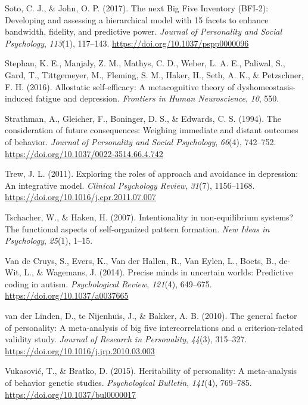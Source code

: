 \documentclass[
  jou,
  floatsintext,
  longtable,
  nolmodern,
  notxfonts,
  notimes,
  12pt,
  colorlinks=true,linkcolor=blue,citecolor=blue,urlcolor=blue]{apa7}
\newlength{\cslhangindent}
\newenvironment{CSLReferences}[2] %
 {\begin{list}{}{%
  \setlength{\itemindent}{0pt}
  \setlength{\leftmargin}{0pt}
  \setlength{\parsep}{0pt}
  \ifodd #1
   \setlength{\leftmargin}{\cslhangindent}
   \setlength{\itemindent}{-1\cslhangindent}
  \fi
  \setlength{\itemsep}{#2\baselineskip}}}
 {\end{list}}
\begin{document}
\begin{CSLReferences}{1}{0}
Soto, C. J., \& John, O. P. (2017). The next {Big} {Five} {Inventory}
({BFI-2}): Developing and assessing a hierarchical model with 15 facets
to enhance bandwidth, fidelity, and predictive power. \emph{Journal of
Personality and Social Psychology}, \emph{113}(1), 117--143.
\url{https://doi.org/10.1037/pspp0000096}

Stephan, K. E., Manjaly, Z. M., Mathys, C. D., Weber, L. A. E., Paliwal,
S., Gard, T., Tittgemeyer, M., Fleming, S. M., Haker, H., Seth, A. K.,
\& Petzschner, F. H. (2016). Allostatic self-efficacy: A metacognitive
theory of dyshomeostasis-induced fatigue and depression. \emph{Frontiers
in Human Neuroscience}, \emph{10}, 550.

Strathman, A., Gleicher, F., Boninger, D. S., \& Edwards, C. S. (1994).
The consideration of future consequences: Weighing immediate and distant
outcomes of behavior. \emph{Journal of Personality and Social
Psychology}, \emph{66}(4), 742--752.
\url{https://doi.org/10.1037/0022-3514.66.4.742}

Trew, J. L. (2011). Exploring the roles of approach and avoidance in
depression: An integrative model. \emph{Clinical Psychology Review},
\emph{31}(7), 1156--1168.
\url{https://doi.org/10.1016/j.cpr.2011.07.007}

Tschacher, W., \& Haken, H. (2007). Intentionality in non-equilibrium
systems? The functional aspects of self-organized pattern formation.
\emph{New Ideas in Psychology}, \emph{25}(1), 1--15.

Van de Cruys, S., Evers, K., Van der Hallen, R., Van Eylen, L., Boets,
B., de-Wit, L., \& Wagemans, J. (2014). Precise minds in uncertain
worlds: Predictive coding in autism. \emph{Psychological Review},
\emph{121}(4), 649--675. \url{https://doi.org/10.1037/a0037665}

van der Linden, D., te Nijenhuis, J., \& Bakker, A. B. (2010). The
general factor of personality: A meta-analysis of big five
intercorrelations and a criterion-related validity study. \emph{Journal
of Research in Personality}, \emph{44}(3), 315--327.
\url{https://doi.org/10.1016/j.jrp.2010.03.003}

Vukasović, T., \& Bratko, D. (2015). Heritability of personality: A
meta-analysis of behavior genetic studies. \emph{Psychological
Bulletin}, \emph{141}(4), 769--785.
\url{https://doi.org/10.1037/bul0000017}


\end{CSLReferences}
\end{document}
